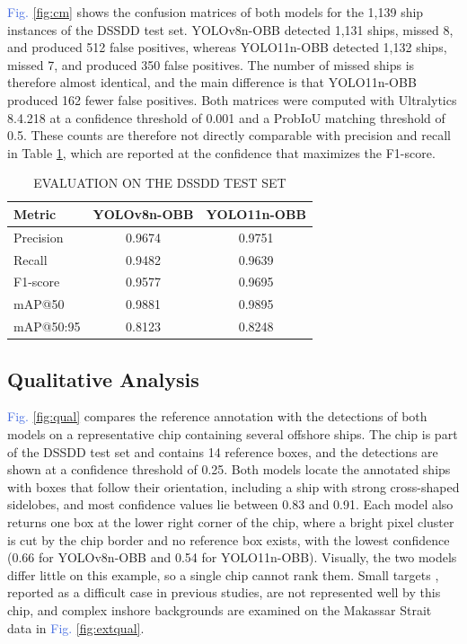 \documentclass[conference]{IEEEtran}
\begin{document}
\textcolor{RoyalBlue}{Fig.} \ref{fig:cm} shows the confusion matrices of both models for the 1,139 ship instances of the DSSDD test set. YOLOv8n-OBB detected 1,131 ships, missed 8, and produced 512 false positives, whereas YOLO11n-OBB detected 1,132 ships, missed 7, and produced 350 false positives. The number of missed ships is therefore almost identical, and the main difference is that YOLO11n-OBB produced 162 fewer false positives. Both matrices were computed with Ultralytics 8.4.218 at a confidence threshold of 0.001 and a ProbIoU matching threshold of 0.5. These counts are therefore not directly comparable with precision and recall in Table \ref{tab:results}, which are reported at the confidence that maximizes the F1-score.

\begin{table}[h!]
	\centering
	\caption{EVALUATION ON THE DSSDD TEST SET}
	\begin{footnotesize}
	\begin{tabular}{lcc}
		\hline
		\textbf{Metric} & \textbf{YOLOv8n-OBB} & \textbf{YOLO11n-OBB} \\
		\hline
		Precision & 0.9674 & 0.9751 \\
		Recall & 0.9482 & 0.9639 \\
		F1-score & 0.9577 & 0.9695 \\
		mAP@50 & 0.9881 & 0.9895 \\
		mAP@50:95 & 0.8123 & 0.8248 \\
		\hline
	\end{tabular}
	\label{tab:results}
	\end{footnotesize}
\end{table}

\subsection{Qualitative Analysis}
\textcolor{RoyalBlue}{Fig.} \ref{fig:qual} compares the reference annotation with the detections of both models on a representative chip containing several offshore ships. The chip is part of the DSSDD test set and contains 14 reference boxes, and the detections are shown at a confidence threshold of 0.25. Both models locate the annotated ships with boxes that follow their orientation, including a ship with strong cross-shaped sidelobes, and most confidence values lie between 0.83 and 0.91. Each model also returns one box at the lower right corner of the chip, where a bright pixel cluster is cut by the chip border and no reference box exists, with the lowest confidence (0.66 for YOLOv8n-OBB and 0.54 for YOLO11n-OBB). Visually, the two models differ little on this example, so a single chip cannot rank them. Small targets \cite{zhang2020lsssdd}, reported as a difficult case in previous studies, are not represented well by this chip, and complex inshore backgrounds \cite{yao2026fsmd} are examined on the Makassar Strait data in \textcolor{RoyalBlue}{Fig.} \ref{fig:extqual}.
\end{document}
